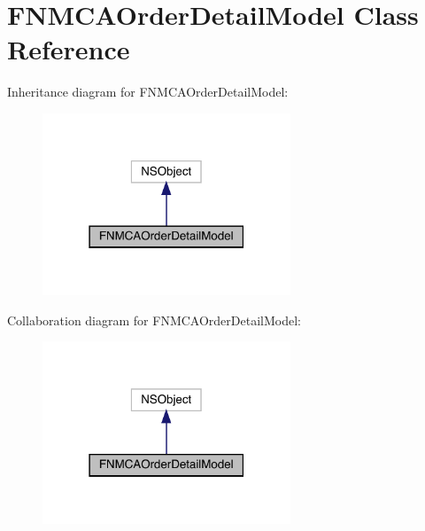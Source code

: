 \hypertarget{interface_f_n_m_c_a_order_detail_model}{}\section{F\+N\+M\+C\+A\+Order\+Detail\+Model Class Reference}
\label{interface_f_n_m_c_a_order_detail_model}


Inheritance diagram for F\+N\+M\+C\+A\+Order\+Detail\+Model\+:\nopagebreak
\begin{figure}[H]
\begin{center}
\leavevmode
\includegraphics[width=210pt]{interface_f_n_m_c_a_order_detail_model__inherit__graph}
\end{center}
\end{figure}


Collaboration diagram for F\+N\+M\+C\+A\+Order\+Detail\+Model\+:\nopagebreak
\begin{figure}[H]
\begin{center}
\leavevmode
\includegraphics[width=210pt]{interface_f_n_m_c_a_order_detail_model__coll__graph}
\end{center}
\end{figure}
